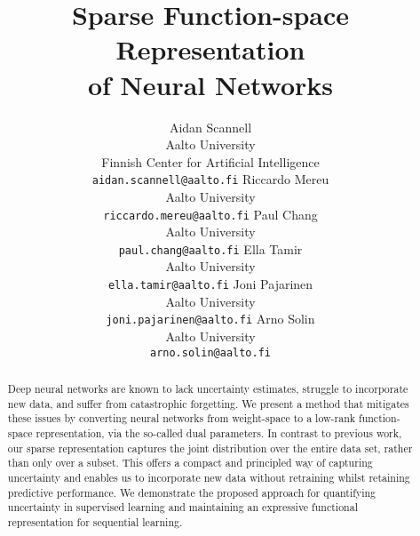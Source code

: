 \documentclass{article}
\title{Sparse Function-space Representation \\ of Neural Networks}%
\author{%
  Aidan Scannell\textsuperscript{\star} \\
  Aalto University \\
  Finnish Center for Artificial Intelligence \\
  \texttt{aidan.scannell@aalto.fi}
  \And
  Riccardo Mereu\textsuperscript{\star} \\
  Aalto University\\
  \texttt{riccardo.mereu@aalto.fi}
  \And
  Paul Chang \\
  Aalto University\\
  \texttt{paul.chang@aalto.fi}
  \And
  Ella Tamir \\
  Aalto University\\
  \texttt{ella.tamir@aalto.fi}
  \And
  Joni Pajarinen \\
  Aalto University\\
  \texttt{joni.pajarinen@aalto.fi}
  \And
  Arno Solin \\
  Aalto University\\
  \texttt{arno.solin@aalto.fi}
}
\begin{document}
\maketitle

\begin{abstract}
%

Deep neural networks are known to lack uncertainty estimates, struggle to incorporate new data, and suffer from catastrophic forgetting. We present a method that mitigates these issues by converting neural networks from weight-space to a low-rank function-space representation, via the so-called dual parameters. In contrast to previous work, our sparse representation captures the joint distribution over the entire data set, rather than only over a subset. This offers a compact and principled way of capturing uncertainty and enables us to incorporate new data without retraining whilst retaining predictive performance. We demonstrate the proposed approach for quantifying uncertainty in supervised learning and maintaining an expressive functional representation for sequential learning.

\end{abstract}
\end{document}
